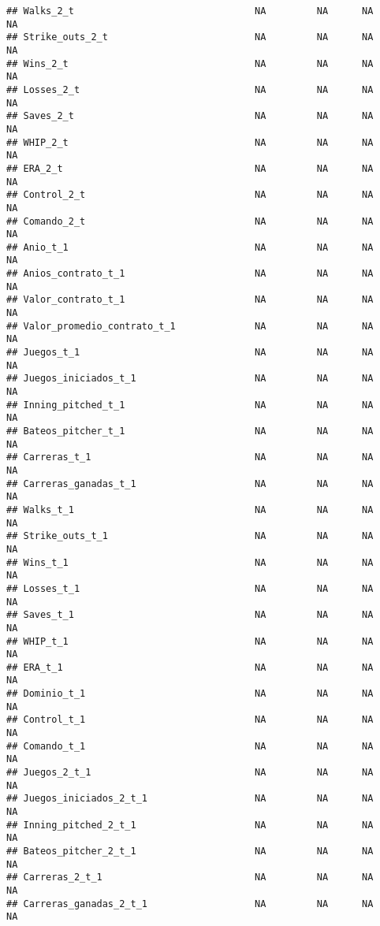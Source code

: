\documentclass[
]{article}
\begin{document}
\begin{verbatim}
## Walks_2_t                                NA         NA      NA       NA
## Strike_outs_2_t                          NA         NA      NA       NA
## Wins_2_t                                 NA         NA      NA       NA
## Losses_2_t                               NA         NA      NA       NA
## Saves_2_t                                NA         NA      NA       NA
## WHIP_2_t                                 NA         NA      NA       NA
## ERA_2_t                                  NA         NA      NA       NA
## Control_2_t                              NA         NA      NA       NA
## Comando_2_t                              NA         NA      NA       NA
## Anio_t_1                                 NA         NA      NA       NA
## Anios_contrato_t_1                       NA         NA      NA       NA
## Valor_contrato_t_1                       NA         NA      NA       NA
## Valor_promedio_contrato_t_1              NA         NA      NA       NA
## Juegos_t_1                               NA         NA      NA       NA
## Juegos_iniciados_t_1                     NA         NA      NA       NA
## Inning_pitched_t_1                       NA         NA      NA       NA
## Bateos_pitcher_t_1                       NA         NA      NA       NA
## Carreras_t_1                             NA         NA      NA       NA
## Carreras_ganadas_t_1                     NA         NA      NA       NA
## Walks_t_1                                NA         NA      NA       NA
## Strike_outs_t_1                          NA         NA      NA       NA
## Wins_t_1                                 NA         NA      NA       NA
## Losses_t_1                               NA         NA      NA       NA
## Saves_t_1                                NA         NA      NA       NA
## WHIP_t_1                                 NA         NA      NA       NA
## ERA_t_1                                  NA         NA      NA       NA
## Dominio_t_1                              NA         NA      NA       NA
## Control_t_1                              NA         NA      NA       NA
## Comando_t_1                              NA         NA      NA       NA
## Juegos_2_t_1                             NA         NA      NA       NA
## Juegos_iniciados_2_t_1                   NA         NA      NA       NA
## Inning_pitched_2_t_1                     NA         NA      NA       NA
## Bateos_pitcher_2_t_1                     NA         NA      NA       NA
## Carreras_2_t_1                           NA         NA      NA       NA
## Carreras_ganadas_2_t_1                   NA         NA      NA       NA

\end{verbatim}
\end{document}

